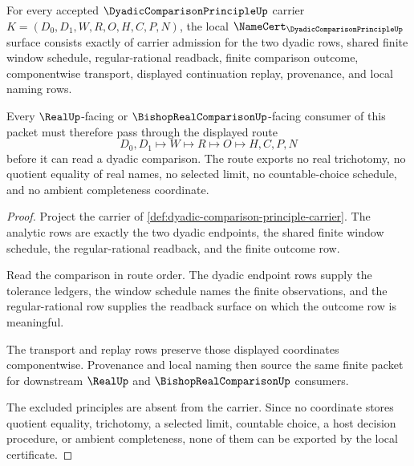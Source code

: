 \begin{theorem}
\label{thm:dyadic-comparison-principle-namecert-obligations}
For every accepted $\DyadicComparisonPrincipleUp$ carrier $K=(D_0,D_1,W,R,O,H,C,P,N)$, the local $\NameCert_{\DyadicComparisonPrincipleUp}$ surface consists exactly of carrier admission for the two dyadic rows, shared finite window schedule, regular-rational readback, finite comparison outcome, componentwise transport, displayed continuation replay, provenance, and local naming rows.

Every $\RealUp$-facing or $\BishopRealComparisonUp$-facing consumer of this packet must therefore pass through the displayed route
$$
D_0,D_1\longmapsto W\longmapsto R\longmapsto O\longmapsto H,C,P,N
$$
before it can read a dyadic comparison. The route exports no real trichotomy, no quotient equality of real names, no selected limit, no countable-choice schedule, and no ambient completeness coordinate.
\end{theorem}
\begin{proof}
Project the carrier of \autoref{def:dyadic-comparison-principle-carrier}. The analytic rows are exactly the two dyadic endpoints, the shared finite window schedule, the regular-rational readback, and the finite outcome row.

Read the comparison in route order. The dyadic endpoint rows supply the tolerance ledgers, the window schedule names the finite observations, and the regular-rational row supplies the readback surface on which the outcome row is meaningful.

The transport and replay rows preserve those displayed coordinates componentwise. Provenance and local naming then source the same finite packet for downstream $\RealUp$ and $\BishopRealComparisonUp$ consumers.

The excluded principles are absent from the carrier. Since no coordinate stores quotient equality, trichotomy, a selected limit, countable choice, a host decision procedure, or ambient completeness, none of them can be exported by the local certificate.
\end{proof}

